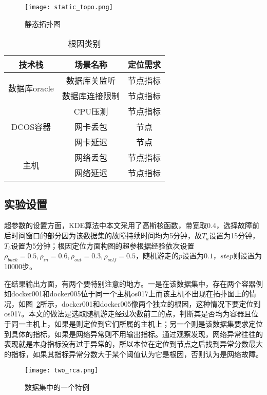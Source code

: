 \begin{figure}[htbp]
    \centering
    \texttt{[image: static\_topo.png]}
    \caption{静态拓扑图}
    \label{fig:static_topo}
  \end{figure}

\begin{table}[htbp]
  \centering
  \begin{tabular}{ccc}
    \toprule
    技术栈 & 场景名称 & 定位需求\\
    \midrule
    \multirow{2}{*}{数据库oracle} & 数据库关监听 & 节点指标\\
     & 数据库连接限制 & 节点指标 \\
    \multirow{3}{*}{DCOS容器} & CPU压测 & 节点指标\\
     & 网卡丢包 & 节点\\
     & 网卡延迟 & 节点\\
    \multirow{2}{*}{主机} & 网络丢包& 节点指标\\
    & 网络延迟 & 节点指标\\
    \bottomrule
  \end{tabular}
  \caption{根因类别}
  \label{tab:error}
\end{table}

\subsection{实验设置}
超参数的设置方面，KDE算法中本文采用了高斯核函数，带宽取0.4，选择故障前后时间窗口的部分因为该数据集的故障持续时间均为5分钟，故$T_a$设置为15分钟，$T_b$设置为5分钟；根因定位方面构图的超参根据经验依次设置$\rho_{back}=0.5, \rho_{in} = 0.6, \rho_{out} = 0.3, \rho_{self} = 0.5$，随机游走的$p$设置为$0.1$，$step$则设置为10000步。

在结果输出方面，有两个要特别注意的地方。一是在该数据集中，存在两个容器例如docker001和docker005位于同一个主机os017上而该主机不出现在拓扑图上的情况，如图~\ref{fig:two:rca}所示，docker001和docker005像两个独立的根因，这种情况下要定位到os017。本文的做法是选取随机游走经过次数前二的点，判断其是否均为容器且位于同一主机上，如果是则定位到它们所属的主机上；另一个则是该数据集要求定位到具体的指标，如果是网络异常则不用输出指标。通过观察发现，网络异常往往的表现就是本身指标没有过于异常的，所以本位在定位到节点之后找到异常分数最大的指标，如果其指标异常分数大于某个阈值认为它是根因，否则认为是网络故障。

\begin{figure}[htbp]
  \centering
  \texttt{[image: two\_rca.png]}
  \caption{数据集中的一个特例}
  \label{fig:two:rca}
\end{figure}


